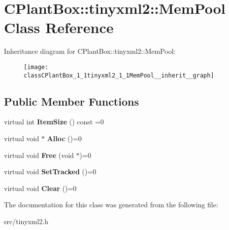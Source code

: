 \hypertarget{classCPlantBox_1_1tinyxml2_1_1MemPool}{}\section{C\+Plant\+Box\+:\+:tinyxml2\+:\+:Mem\+Pool Class Reference}
\label{classCPlantBox_1_1tinyxml2_1_1MemPool}


Inheritance diagram for C\+Plant\+Box\+:\+:tinyxml2\+:\+:Mem\+Pool\+:\nopagebreak
\begin{figure}[H]
\begin{center}
\leavevmode
\texttt{[image: classCPlantBox\_1\_1tinyxml2\_1\_1MemPool\_\_inherit\_\_graph]}
\end{center}
\end{figure}
\subsection*{Public Member Functions}
\begin{DoxyCompactItemize}
\item 
\mbox{\label{classCPlantBox_1_1tinyxml2_1_1MemPool_a2a69a5f946316d8c0a8dab2e57a5322b}} 
virtual int {\bfseries Item\+Size} () const =0
\item 
\mbox{\label{classCPlantBox_1_1tinyxml2_1_1MemPool_a967f9c5aee7308afcd90a0ed98e5f75f}} 
virtual void $\ast$ {\bfseries Alloc} ()=0
\item 
\mbox{\label{classCPlantBox_1_1tinyxml2_1_1MemPool_aff94c5932df6b157fb6e631404d7ad3d}} 
virtual void {\bfseries Free} (void $\ast$)=0
\item 
\mbox{\label{classCPlantBox_1_1tinyxml2_1_1MemPool_aa4e3a16a55d297074a5ad488d2f88798}} 
virtual void {\bfseries Set\+Tracked} ()=0
\item 
\mbox{\label{classCPlantBox_1_1tinyxml2_1_1MemPool_a459afd20c05174056fefbee12002540c}} 
virtual void {\bfseries Clear} ()=0
\end{DoxyCompactItemize}


The documentation for this class was generated from the following file\+:\begin{DoxyCompactItemize}
\item 
src/tinyxml2.\+h\end{DoxyCompactItemize}

